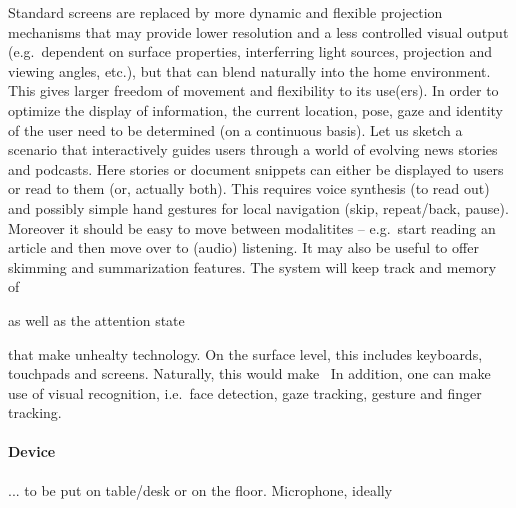 \documentclass{article}
\begin{document}
Standard screens are replaced by more dynamic and flexible projection mechanisms that may provide lower resolution and a less controlled visual output (e.g.~dependent on surface properties, interferring light sources, projection and viewing angles, etc.), but that can blend naturally into the home environment. This gives larger freedom of movement and flexibility to its use(ers). In order to optimize the display of information, the current location, pose, gaze and identity of the user need to be determined (on a continuous basis). Let us sketch a scenario that interactively guides users through a world of evolving news stories and podcasts. Here stories or document snippets can either be displayed to users or read to them (or, actually both). This requires voice synthesis (to read out) and possibly simple hand gestures for local navigation (skip, repeat/back, pause). Moreover it should be easy to move between modalitites -- e.g.~start  reading an article and then move over to (audio) listening. It may also be useful to offer skimming and summarization features. The system will keep track and memory of 

\newpage


as well as the attention state 



\newpage


that make unhealty technology. On the surface level, this includes keyboards, touchpads and screens. Naturally, this would make \ In addition, one can make use of visual recognition, i.e.~face detection, gaze tracking, gesture and finger tracking.

\newpage

\paragraph{Device} ... to be put on table/desk or on the floor. Microphone, ideally 



\end{document}
